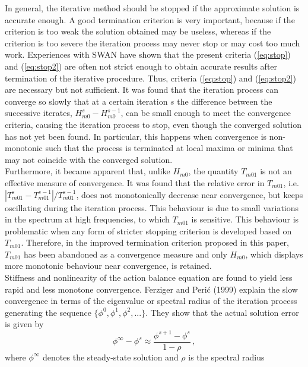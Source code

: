 \documentclass[12pt]{book}
\begin{document}
In general, the iterative method should be stopped if the approximate solution is
accurate enough. A good termination criterion is very important, because if the criterion
is too weak the solution obtained may be useless, whereas if the criterion is too
severe the iteration process may never stop or may cost too much work.
Experiences with SWAN have shown that the present criteria (\ref{eq:stop}) and (\ref{eq:stop2}) are
often not strict enough to obtain accurate results after termination of the iterative
procedure.
Thus, criteria (\ref{eq:stop}) and (\ref{eq:stop2})
are necessary but not sufficient.
It was found that the iteration process can converge so slowly that at a certain
iteration $s$ the difference between the successive iterates, $H^s_{m0} - H^{s-1}_{m0}$,
can be small enough to meet the convergence criteria, causing the iteration process to stop, even though
the converged solution has not yet been found. In particular, this happens when convergence is non-monotonic
such that the process is terminated at local maxima or minima that may not coincide with the
converged solution.
\\[2ex]
\noindent
Furthermore, it became apparent
that, unlike $H_{m0}$, the quantity $T_{m01}$ is not an effective measure of
convergence. It was found that the relative error in $T_{m01}$, i.e.
$|T^s_{m01} - T^{s-1}_{m01}|/T^{s-1}_{m01}$, does not monotonically
decrease near convergence, but keeps
oscillating during the iteration process. This behaviour is due to small variations
in the spectrum at high frequencies, to which $T_{m01}$ is sensitive.
This
behaviour is problematic when any form of stricter stopping criterion is developed
based on $T_{m01}$. Therefore, in the improved termination criterion
proposed in this paper, $T_{m01}$ has been abandoned as a convergence
measure and only $H_{m0}$, which displays more monotonic behaviour near
convergence, is retained.
\\[2ex]
\noindent
Stiffness and nonlinearity of the action balance equation are found to yield less rapid and
less monotone convergence. Ferziger and Peri\'{c} (1999) explain the slow convergence
in terms of the eigenvalue or spectral radius of the iteration process generating the sequence
$\{{\phi}^0, {\phi}^1, {\phi}^2,...\}$. They show that the actual solution error
is given by
\begin{equation}
  {\phi}^{\infty} - {\phi}^s \approx \frac{{\phi}^{s+1} - {\phi}^s}{1-\rho} \, ,
\end{equation}
where ${\phi}^{\infty}$ denotes the steady-state solution and $\rho$ is the spectral radius
\end{document}
